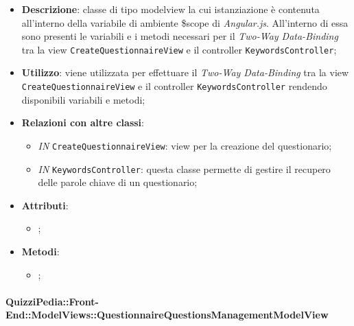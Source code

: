 				\begin{itemize}
					\item \textbf{Descrizione}: classe di tipo modelview la cui istanziazione è contenuta all'interno della variabile di ambiente \$scope di \textit{Angular.js}. All'interno di essa sono presenti le variabili e i metodi necessari per il \textit{Two-Way Data-Binding} tra la view \texttt{CreateQuestionnaireView} e il controller \texttt{KeywordsController};
					\item \textbf{Utilizzo}: viene utilizzata per effettuare il \textit{Two-Way Data-Binding} tra la view \texttt{CreateQuestionnaireView} e il controller \texttt{KeywordsController} rendendo disponibili variabili e metodi;
					\item \textbf{Relazioni con altre classi}: 
					\begin{itemize}
						\item \textit{IN} \texttt{CreateQuestionnaireView}: view per la creazione del questionario; 
						\item \textit{IN} \texttt{KeywordsController}: questa classe permette di gestire il recupero delle parole chiave di un questionario;
					\end{itemize}
					\item \textbf{Attributi}: 
					\begin{itemize}
						\item ;
					\end{itemize}
					\item \textbf{Metodi}: 
					\begin{itemize}
						\item ;
					\end{itemize}
				\end{itemize}
				
					\paragraph{QuizziPedia::Front-End::ModelViews::QuestionnaireQuestionsManagementModelView}
					
					\label{QuizziPedia::Front-End::ModelViews::QuestionnaireQuestionsManagementModelView}
					
